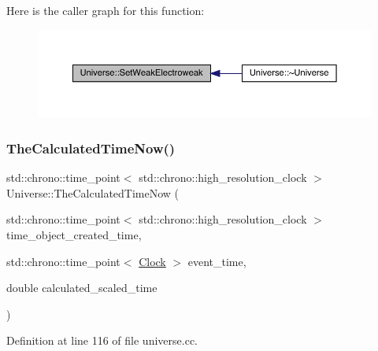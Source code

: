 Here is the caller graph for this function\+:
\nopagebreak
\begin{figure}[H]
\begin{center}
\leavevmode
\includegraphics[width=350pt]{class_universe_a2d3d642bfdc863248e93535832fa4b00_icgraph}
\end{center}
\end{figure}
\mbox{\label{class_universe_aa220508c4cc12b02c6fe494622ebb58d}} 
\subsubsection{\texorpdfstring{The\+Calculated\+Time\+Now()}{TheCalculatedTimeNow()}}
{\footnotesize\ttfamily std\+::chrono\+::time\+\_\+point$<$ std\+::chrono\+::high\+\_\+resolution\+\_\+clock $>$ Universe\+::\+The\+Calculated\+Time\+Now (\begin{DoxyParamCaption}\item[{std\+::chrono\+::time\+\_\+point$<$ std\+::chrono\+::high\+\_\+resolution\+\_\+clock $>$}]{time\+\_\+object\+\_\+created\+\_\+time,  }\item[{std\+::chrono\+::time\+\_\+point$<$ \hyperlink{universe_8h_a0ef8d951d1ca5ab3cfaf7ab4c7a6fd80}{Clock} $>$}]{event\+\_\+time,  }\item[{double}]{calculated\+\_\+scaled\+\_\+time }\end{DoxyParamCaption})}



Definition at line 116 of file universe.\+cc.

